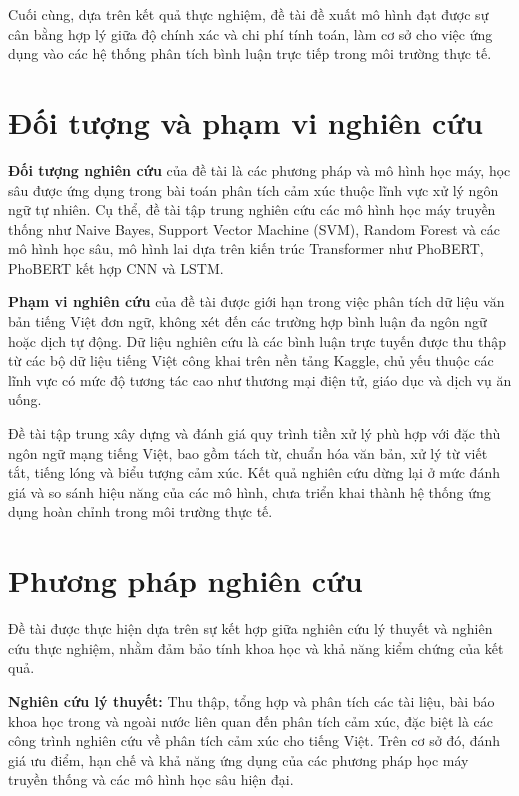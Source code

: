 \documentclass[14pt, a4paper]{report}
\begin{document}
Cuối cùng, dựa trên kết quả thực nghiệm, đề tài đề xuất mô hình đạt được sự cân bằng hợp lý giữa độ chính xác và chi phí tính toán, làm cơ sở cho việc ứng dụng vào các hệ thống phân tích bình luận trực tiếp trong môi trường thực tế.

\section{Đối tượng và phạm vi nghiên cứu}

\textbf{Đối tượng nghiên cứu} của đề tài là các phương pháp và mô hình học máy, học sâu được ứng dụng trong bài toán phân tích cảm xúc thuộc lĩnh vực xử lý ngôn ngữ tự nhiên. Cụ thể, đề tài tập trung nghiên cứu các mô hình học máy truyền thống như Naive Bayes, Support Vector Machine (SVM), Random Forest và các mô hình học sâu, mô hình lai dựa trên kiến trúc Transformer như PhoBERT, PhoBERT kết hợp CNN và LSTM.

\textbf{Phạm vi nghiên cứu} của đề tài được giới hạn trong việc phân tích dữ liệu văn bản tiếng Việt đơn ngữ, không xét đến các trường hợp bình luận đa ngôn ngữ hoặc dịch tự động. Dữ liệu nghiên cứu là các bình luận trực tuyến được thu thập từ các bộ dữ liệu tiếng Việt công khai trên nền tảng Kaggle, chủ yếu thuộc các lĩnh vực có mức độ tương tác cao như thương mại điện tử, giáo dục và dịch vụ ăn uống.

Đề tài tập trung xây dựng và đánh giá quy trình tiền xử lý phù hợp với đặc thù ngôn ngữ mạng tiếng Việt, bao gồm tách từ, chuẩn hóa văn bản, xử lý từ viết tắt, tiếng lóng và biểu tượng cảm xúc. Kết quả nghiên cứu dừng lại ở mức đánh giá và so sánh hiệu năng của các mô hình, chưa triển khai thành hệ thống ứng dụng hoàn chỉnh trong môi trường thực tế.

\section{Phương pháp nghiên cứu}

Đề tài được thực hiện dựa trên sự kết hợp giữa nghiên cứu lý thuyết và nghiên cứu thực nghiệm, nhằm đảm bảo tính khoa học và khả năng kiểm chứng của kết quả.

\textbf{Nghiên cứu lý thuyết:} Thu thập, tổng hợp và phân tích các tài liệu, bài báo khoa học trong và ngoài nước liên quan đến phân tích cảm xúc, đặc biệt là các công trình nghiên cứu về phân tích cảm xúc cho tiếng Việt. Trên cơ sở đó, đánh giá ưu điểm, hạn chế và khả năng ứng dụng của các phương pháp học máy truyền thống và các mô hình học sâu hiện đại.
\end{document}
